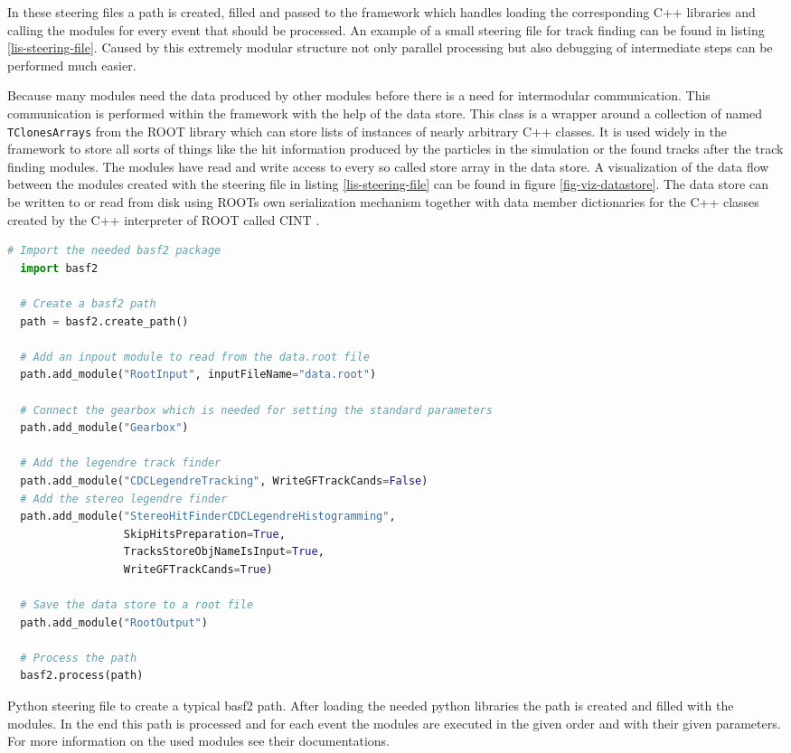 In these steering files a path is created, filled and passed to the framework which handles loading the corresponding C++ libraries and calling the modules for every event that should be processed. An example of a small steering file for track finding can be found in listing \ref{lis-steering-file}. Caused by this extremely modular structure not only parallel processing but also debugging of intermediate steps can be performed much easier.

Because many modules need the data produced by other modules before there is a need for intermodular communication. This communication is performed within the framework with the help of the data store. This class is a wrapper around a collection of named \texttt{TClonesArrays} from the ROOT library \cite{tclonesarray} which can store lists of instances of nearly arbitrary C++ classes. It is used widely in the framework to store all sorts of things like the hit information produced by the particles in the simulation or the found tracks after the track finding modules. The modules have read and write access to every so called store array in the data store. A visualization of the data flow between the modules created with the steering file in listing \ref{lis-steering-file} can be found in figure \ref{fig-viz-datastore}. The data store can be written to or read from disk using ROOTs own serialization mechanism together with data member dictionaries for the C++ classes created by the C++ interpreter of ROOT called CINT \cite{cint}.

\begin{listing}
 \begin{lstlisting}[language=Python]
  # Import the needed basf2 package
  import basf2

  # Create a basf2 path
  path = basf2.create_path()

  # Add an inpout module to read from the data.root file
  path.add_module("RootInput", inputFileName="data.root")
  
  # Connect the gearbox which is needed for setting the standard parameters
  path.add_module("Gearbox")

  # Add the legendre track finder
  path.add_module("CDCLegendreTracking", WriteGFTrackCands=False)
  # Add the stereo legendre finder
  path.add_module("StereoHitFinderCDCLegendreHistogramming",
                  SkipHitsPreparation=True,
                  TracksStoreObjNameIsInput=True,
                  WriteGFTrackCands=True)
  
  # Save the data store to a root file
  path.add_module("RootOutput")

  # Process the path
  basf2.process(path)

 \end{lstlisting}
 \caption{Python steering file to create a typical basf2 path. After loading the needed python libraries the path is created and filled with the modules. In the end this path is processed and for each event the modules are executed in the given order and with their given parameters. For more information on the used modules see their documentations.}
 \label{lis-steering-file}
\end{listing}


